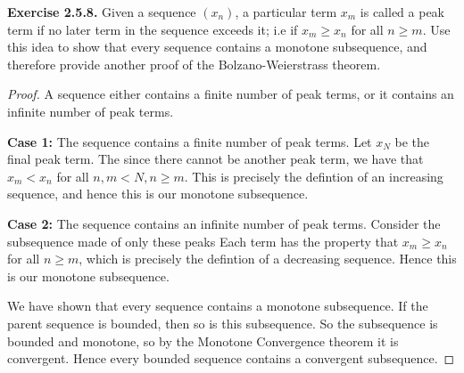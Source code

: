 \documentclass{article}
\begin{document}
\textbf{Exercise 2.5.8.} Given a sequence $(x_n)$, a particular term $x_m$ is called a peak term if no later term
in the sequence exceeds it; i.e if $x_m \ge x_n$ for all $n \ge m$. Use this idea to show that every sequence contains a monotone
subsequence, and therefore provide another proof of the Bolzano-Weierstrass theorem.

\begin{proof}
    A sequence either contains a finite number of peak terms, or it contains an infinite number of peak terms.

    \textbf{Case 1:} The sequence contains a finite number of peak terms. Let $x_N$ be the final peak term.
    The since there cannot be another peak term, we have that $x_m < x_n$ for all $n, m < N, n \ge m$. This is
    precisely the defintion of an increasing sequence, and hence this is our monotone subsequence.

    \textbf{Case 2:} The sequence contains an infinite number of peak terms. Consider the subsequence made of only these peaks
    Each term has the property that $x_m \ge x_n$ for all $n \ge m$, which is precisely the defintion of a decreasing sequence.
    Hence this is our monotone subsequence.

    We have shown that every sequence contains a monotone subsequence. If the parent sequence is bounded, then so is this subsequence.
    So the subsequence is bounded and monotone, so by the Monotone Convergence theorem it is convergent. Hence every bounded sequence contains
    a convergent subsequence.
\end{proof}
\end{document}
